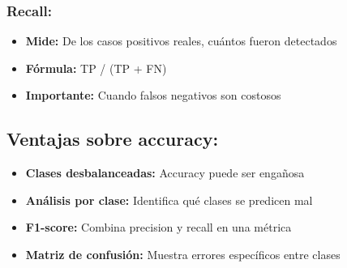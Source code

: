 \documentclass[12pt,a4paper]{article}
\begin{document}
\subsubsection*{Recall:}
\begin{itemize}[leftmargin=1.5cm]
    \item \textbf{Mide:} De los casos positivos reales, cuántos fueron detectados
    \item \textbf{Fórmula:} TP / (TP + FN)
    \item \textbf{Importante:} Cuando falsos negativos son costosos
\end{itemize}

\subsection*{Ventajas sobre accuracy:}
\begin{itemize}[leftmargin=1.5cm]
    \item \textbf{Clases desbalanceadas:} Accuracy puede ser engañosa
    \item \textbf{Análisis por clase:} Identifica qué clases se predicen mal
    \item \textbf{F1-score:} Combina precision y recall en una métrica
    \item \textbf{Matriz de confusión:} Muestra errores específicos entre clases
\end{itemize}
\end{document}
